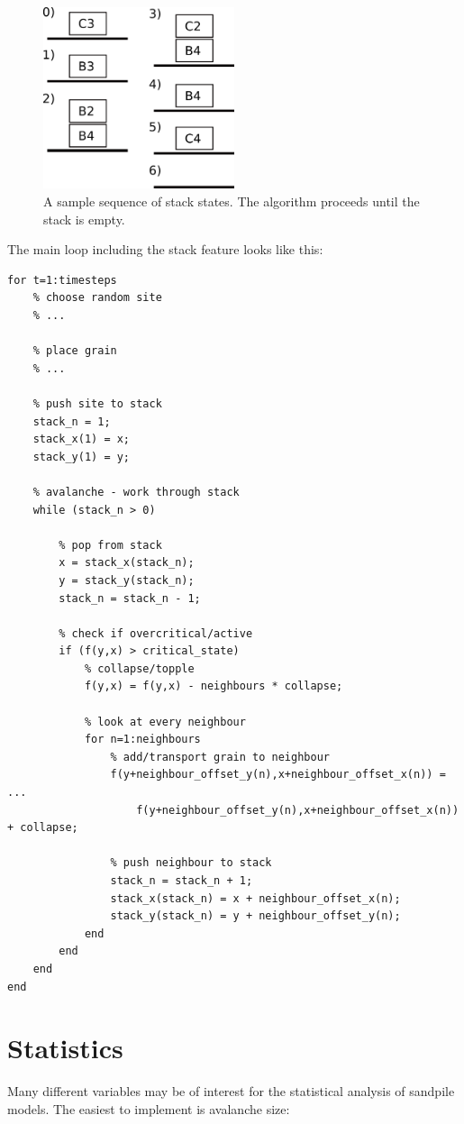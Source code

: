 \begin{figure}[!htpb]
\centering
\includegraphics[width=0.5\textwidth]{pics/pic2_stack1.pdf}
\caption[]{A sample sequence of stack states. The algorithm proceeds until the stack is empty.}
\label{pics:stack1}
\end{figure}

The main loop including the stack feature looks like this:
\begin{lstlisting}
for t=1:timesteps
	% choose random site
	% ...

	% place grain
	% ...

	% push site to stack
	stack_n = 1;
	stack_x(1) = x;
	stack_y(1) = y;

	% avalanche - work through stack
	while (stack_n > 0)

		% pop from stack
		x = stack_x(stack_n);
		y = stack_y(stack_n);
		stack_n = stack_n - 1;

		% check if overcritical/active
		if (f(y,x) > critical_state)
			% collapse/topple
			f(y,x) = f(y,x) - neighbours * collapse;

			% look at every neighbour
			for n=1:neighbours
				% add/transport grain to neighbour
				f(y+neighbour_offset_y(n),x+neighbour_offset_x(n)) = ...
					f(y+neighbour_offset_y(n),x+neighbour_offset_x(n)) + collapse;

				% push neighbour to stack
				stack_n = stack_n + 1;
				stack_x(stack_n) = x + neighbour_offset_x(n);
				stack_y(stack_n) = y + neighbour_offset_y(n);
			end
		end
	end
end
\end{lstlisting}


\section{Statistics}\label{chp3:statistics}
Many different variables may be of interest for the statistical analysis of sandpile models. The easiest to implement is avalanche size:

